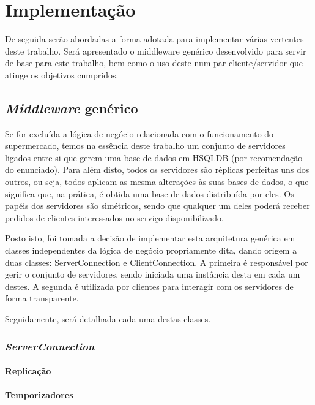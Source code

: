 \documentclass[a4paper]{report}
\begin{document}
\chapter{Implementação} \label{ch:Implementation}
\large{
	De seguida serão abordadas a forma adotada para implementar várias vertentes deste trabalho. Será apresentado o middleware genérico desenvolvido para servir de base para este trabalho, bem como o uso deste num par cliente/servidor que atinge os objetivos cumpridos.

	\section{\textit{Middleware} genérico} \label{sec:Middleware}
		Se for excluída a lógica de negócio relacionada com o funcionamento do supermercado, temos na essência deste trabalho um conjunto de servidores ligados entre si que gerem uma base de dados em HSQLDB (por recomendação do enunciado). Para além disto, todos os servidores são réplicas perfeitas uns dos outros, ou seja, todos aplicam as mesma alterações às suas bases de dados, o que significa que, na prática, é obtida uma base de dados distribuída por eles. Os papéis dos servidores são simétricos, sendo que qualquer um deles poderá receber pedidos de clientes interessados no serviço disponibilizado.

		Posto isto, foi tomada a decisão de implementar esta arquitetura genérica em classes independentes da lógica de negócio propriamente dita, dando origem a duas classes: ServerConnection e ClientConnection. A primeira é responsável por gerir o conjunto de servidores, sendo iniciada uma instância desta em cada um destes. A segunda é utilizada por clientes para interagir com os servidores de forma transparente.

		Seguidamente, será detalhada cada uma destas classes.

		\subsection{\textit{ServerConnection}} \label{subsec:ServerConnection}
			\subsubsection{Replicação} \label{sssec:Replication}
			\subsubsection{Temporizadores} \label{sssec:Timers}
}
\end{document}
